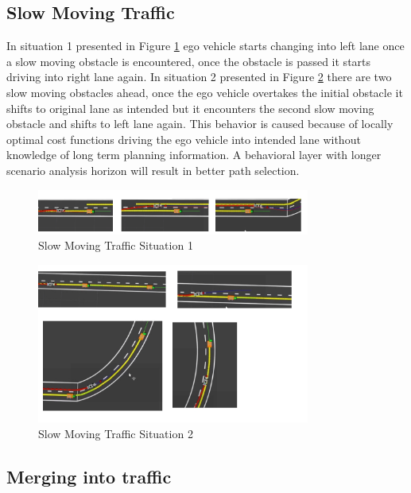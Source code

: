 \subsection{Slow Moving Traffic}
In situation 1 presented in Figure \ref{slow_moving_1} ego vehicle starts changing into left lane once a slow moving obstacle is encountered, once the obstacle is passed it starts driving into right lane again. In situation 2 presented in Figure \ref{slow_moving_2} there are two slow moving obstacles ahead, once the ego vehicle overtakes the initial obstacle it shifts to original lane as intended but it encounters the second slow moving obstacle and shifts to left lane again. This behavior is caused because of locally optimal cost functions driving the ego vehicle into intended lane without knowledge of long term planning information. A behavioral layer with longer scenario analysis horizon will result in better path selection.
\begin{figure}[h]
    \centering
    \includegraphics[width=0.8\textwidth]{Images/evaluation/slow_moving1.jpg}
    \caption{Slow Moving Traffic Situation 1}
    \label{slow_moving_1}
\end{figure}

\begin{figure}[h]
    \centering
    \includegraphics[width=0.8\textwidth]{Images/evaluation/slow_moving2.jpg}
    \caption{Slow Moving Traffic Situation 2}
    \label{slow_moving_2}
\end{figure}

\subsection{Merging into traffic}

